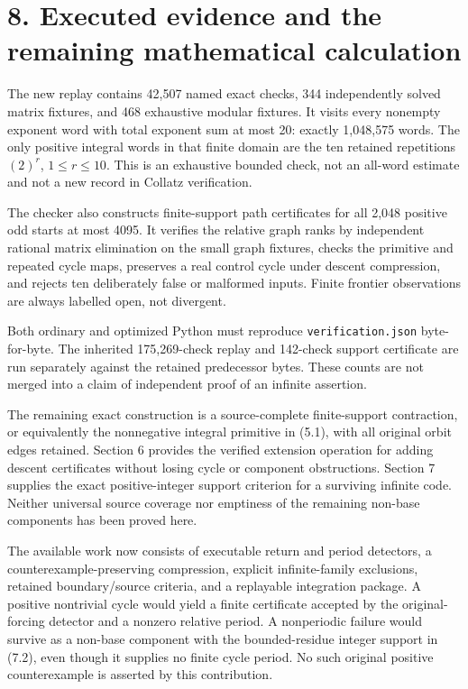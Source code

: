 \section{8. Executed evidence and the remaining mathematical
calculation}

The new replay contains 42,507 named exact checks, 344 independently
solved matrix fixtures, and 468 exhaustive modular fixtures. It visits
every nonempty exponent word with total exponent sum at most 20: exactly
1,048,575 words. The only positive integral words in that finite domain
are the ten retained repetitions \((2)^r\), \(1\le r\le10\). This is an
exhaustive bounded check, not an all-word estimate and not a new record
in Collatz verification.

The checker also constructs finite-support path certificates for all
2,048 positive odd starts at most 4095. It verifies the relative graph
ranks by independent rational matrix elimination on the small graph
fixtures, checks the primitive and repeated cycle maps, preserves a real
control cycle under descent compression, and rejects ten deliberately
false or malformed inputs. Finite frontier observations are always
labelled open, not divergent.

Both ordinary and optimized Python must reproduce
\nolinkurl{verification.json} byte-for-byte. The inherited 175,269-check
replay and 142-check support certificate are run separately against the
retained predecessor bytes. These counts are not merged into a claim of
independent proof of an infinite assertion.

The remaining exact construction is a source-complete finite-support
contraction, or equivalently the nonnegative integral primitive in
(5.1), with all original orbit edges retained. Section 6 provides the
verified extension operation for adding descent certificates without
losing cycle or component obstructions. Section 7 supplies the exact
positive-integer support criterion for a surviving infinite code.
Neither universal source coverage nor emptiness of the remaining
non-base components has been proved here.

The available work now consists of executable return and period
detectors, a counterexample-preserving compression, explicit
infinite-family exclusions, retained boundary/source criteria, and a
replayable integration package. A positive nontrivial cycle would yield
a finite certificate accepted by the original-forcing detector and a
nonzero relative period. A nonperiodic failure would survive as a
non-base component with the bounded-residue integer support in (7.2),
even though it supplies no finite cycle period. No such original
positive counterexample is asserted by this contribution.

